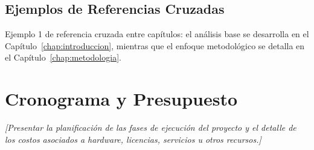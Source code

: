 \subsection{Ejemplos de Referencias Cruzadas}
Ejemplo 1 de referencia cruzada entre capítulos: el análisis base se desarrolla en el Capítulo~\ref{chap:introduccion}, mientras que el enfoque metodológico se detalla en el Capítulo~\ref{chap:metodologia}.


\section{Cronograma y Presupuesto}
\textit{[Presentar la planificación de las fases de ejecución del proyecto y el detalle de los costos asociados a hardware, licencias, servicios u otros recursos.]}
